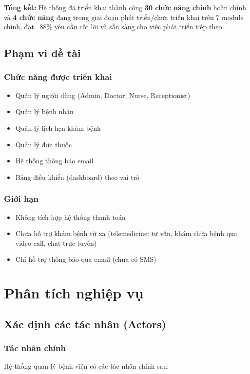 \documentclass[12pt,a4paper]{report}
\begin{document}
\textbf{Tổng kết:} Hệ thống đã triển khai thành công \textbf{30 chức năng chính} hoàn chỉnh và \textbf{4 chức năng} đang trong giai đoạn phát triển/chưa triển khai trên 7 module chính, đạt ~88\% yêu cầu cốt lõi và sẵn sàng cho việc phát triển tiếp theo.

\section{Phạm vi đề tài}
\subsection{Chức năng được triển khai}
\begin{itemize}
    \item Quản lý người dùng (Admin, Doctor, Nurse, Receptionist)
    \item Quản lý bệnh nhân
    \item Quản lý lịch hẹn khám bệnh
    \item Quản lý đơn thuốc
    \item Hệ thống thông báo email
    \item Bảng điều khiển (dashboard) theo vai trò
\end{itemize}

\subsection{Giới hạn}
\begin{itemize}
    \item Không tích hợp hệ thống thanh toán
    \item Chưa hỗ trợ khám bệnh từ xa (telemedicine: tư vấn, khám chữa bệnh qua video call, chat trực tuyến)
    \item Chỉ hỗ trợ thông báo qua email (chưa có SMS)
\end{itemize}

\chapter{Phân tích nghiệp vụ}

\section{Xác định các tác nhân (Actors)}

\subsection{Tác nhân chính}
Hệ thống quản lý bệnh viện có các tác nhân chính sau:
\end{document}
